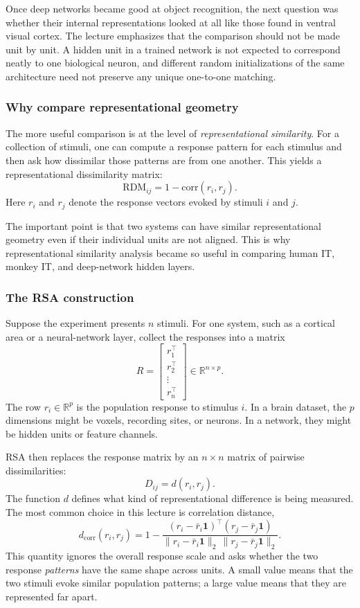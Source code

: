 Once deep networks became good at object recognition, the next question was whether their internal representations looked at all like those found in ventral visual cortex. The lecture emphasizes that the comparison should not be made unit by unit. A hidden unit in a trained network is not expected to correspond neatly to one biological neuron, and different random initializations of the same architecture need not preserve any unique one-to-one matching.

\subsubsection{Why compare representational geometry}

The more useful comparison is at the level of \emph{representational similarity}. For a collection of stimuli, one can compute a response pattern for each stimulus and then ask how dissimilar those patterns are from one another. This yields a representational dissimilarity matrix:
\[
\mathrm{RDM}_{ij} = 1 - \mathrm{corr}(r_i, r_j).
\]
Here \(r_i\) and \(r_j\) denote the response vectors evoked by stimuli \(i\) and \(j\).

The important point is that two systems can have similar representational geometry even if their individual units are not aligned. This is why representational similarity analysis became so useful in comparing human IT, monkey IT, and deep-network hidden layers.

\subsubsection{The RSA construction}

Suppose the experiment presents \(n\) stimuli. For one system, such as a cortical area or a neural-network layer, collect the responses into a matrix
\[
R =
\begin{bmatrix}
r_1^\top \\
r_2^\top \\
\vdots \\
r_n^\top
\end{bmatrix}
\in \mathbb{R}^{n \times p}.
\]
The row \(r_i \in \mathbb{R}^p\) is the population response to stimulus \(i\). In a brain dataset, the \(p\) dimensions might be voxels, recording sites, or neurons. In a network, they might be hidden units or feature channels.

RSA then replaces the response matrix by an \(n \times n\) matrix of pairwise dissimilarities:
\[
D_{ij} = d(r_i,r_j).
\]
The function \(d\) defines what kind of representational difference is being measured. The most common choice in this lecture is correlation distance,
\[
d_{\mathrm{corr}}(r_i,r_j)
= 1 -
\frac{(r_i-\bar r_i \mathbf{1})^\top (r_j-\bar r_j \mathbf{1})}
{\|r_i-\bar r_i \mathbf{1}\|_2 \, \|r_j-\bar r_j \mathbf{1}\|_2}.
\]
This quantity ignores the overall response scale and asks whether the two response \emph{patterns} have the same shape across units. A small value means that the two stimuli evoke similar population patterns; a large value means that they are represented far apart.

